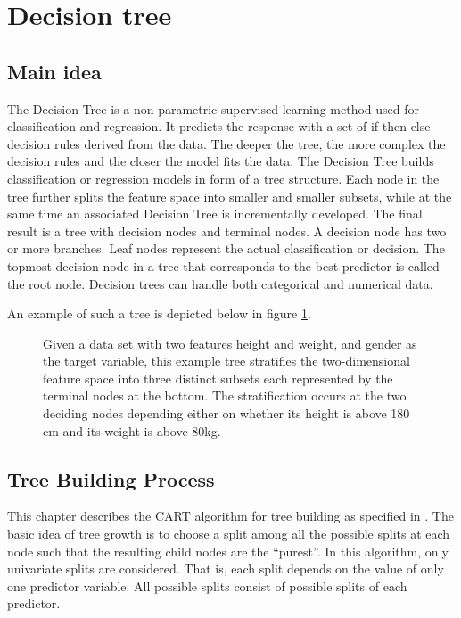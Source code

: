 \section{Decision tree}

\subsection{Main idea}
The Decision Tree is a non-parametric supervised learning method used for classification and regression.
It predicts the response with a set of if-then-else decision rules derived from the data.
The deeper the tree, the more complex the decision rules and the closer the model fits the data.
The Decision Tree builds classification or regression models in form of a tree structure.
Each node in the tree further splits the feature space into smaller and smaller subsets, 
while at the same time an associated Decision Tree is incrementally developed.
The final result is a tree with decision nodes and terminal nodes. 
A decision node has two or more branches.
Leaf nodes represent the actual classification or decision. 
The topmost decision node in a tree that corresponds to the best predictor is called the root node.
Decision trees can handle both categorical and numerical data.

An example of such a tree is depicted below in figure \ref{fig:decision_tree_example}.

\begin{figure}[H]
    \captionsetup{format=plain}
    \caption{Given a data set with two features height and weight, and gender as the target variable, 
             this example tree stratifies the two-dimensional feature space into three distinct subsets each 
             represented by the terminal nodes at the bottom.
             The stratification occurs at the two deciding nodes depending either on whether its height is above 180 cm 
             and its weight is above 80kg.
             }
    \label{fig:decision_tree_example}
\end{figure}

\subsection{Tree Building Process}
This chapter describes the CART algorithm for tree building as specified in \cite{breiman1984classification}.
The basic idea of tree growth is to choose a split among all the possible splits at each node
such that the resulting child nodes are the “purest”. In this algorithm, only univariate splits are
considered. That is, each split depends on the value of only one predictor variable. All
possible splits consist of possible splits of each predictor.

